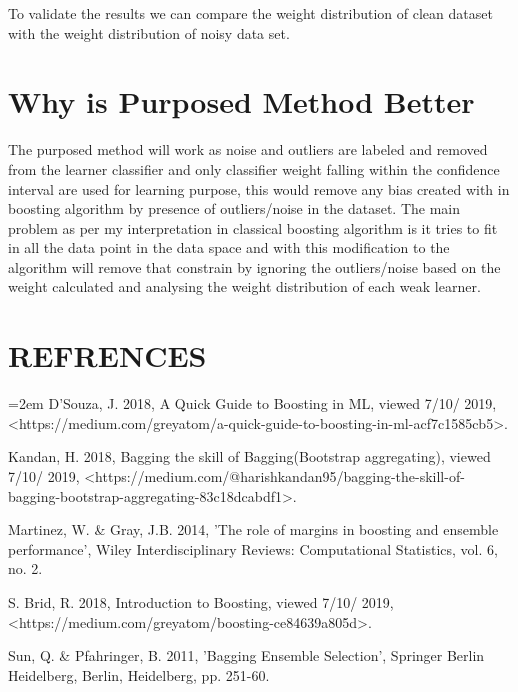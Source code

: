 \documentclass{article}
\begin{document}
To validate the results we can compare the weight distribution of clean dataset with the weight distribution of noisy data set. 

        
\section{Why is Purposed Method Better}\label{conclusion}
The purposed method will work as noise and outliers are labeled and removed from the learner classifier and only classifier weight falling within the confidence interval are used for learning purpose, this would remove any bias created with in boosting algorithm by presence of outliers/noise in the dataset. The main problem as per my interpretation in classical boosting algorithm is it tries to fit in all the data point in the data space and with this modification to the algorithm will remove that constrain by ignoring the outliers/noise based on the weight calculated and analysing the weight distribution of each weak learner. 
\pagebreak
\section{REFRENCES}\label{refrences}
\begin{flushleft}

\hangindent=2em
D'Souza, J. 2018, A Quick Guide to Boosting in ML, viewed 7/10/ 2019, <https://medium.com/greyatom/a-quick-guide-to-boosting-in-ml-acf7c1585cb5>.\linebreak

Kandan, H. 2018, Bagging the skill of Bagging(Bootstrap aggregating), viewed 7/10/ 2019, <https://medium.com/@harishkandan95/bagging-the-skill-of-bagging-bootstrap-aggregating-83c18dcabdf1>.\linebreak

Martinez, W. & Gray, J.B. 2014, 'The role of margins in boosting and ensemble performance', Wiley Interdisciplinary Reviews: Computational Statistics, vol. 6, no. 2.

S. Brid, R. 2018, Introduction to Boosting, viewed 7/10/ 2019, <https://medium.com/greyatom/boosting-ce84639a805d>.\linebreak

Sun, Q. & Pfahringer, B. 2011, 'Bagging Ensemble Selection', Springer Berlin Heidelberg, Berlin, Heidelberg, pp. 251-60.\linebreak



\pagebreak
\end{flushleft}
\end{document}

